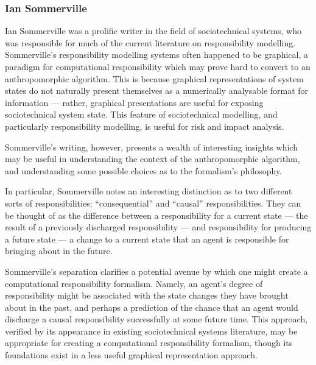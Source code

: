 \subsubsection{Ian Sommerville}
Ian Sommerville was a prolific writer in the field of sociotechnical systems, who was responsible for much of the current literature on responsibility modelling\cite{sommerville_graphical_responsibility,sommerville_dependable_systems_chap_8,sommerville_dependable_systems_chapter_9}. Sommerville's responsibility modelling systems often happened to be graphical\cite{sommerville_graphical_responsibility}, a paradigm for computational responsibility which may prove hard to convert to an anthropomorphic algorithm. This is because graphical representations of system states do not naturally present themselves as a numerically analysable format for information --- rather, graphical presentations are useful for exposing sociotechnical system state. This feature of sociotechnical modelling, and particularly responsibility modelling, is useful for risk and impact analysis\cite{ObashiMethodology}.\par

Sommerville's writing, however, presents a wealth of interesting insights which may be useful in understanding the context of the anthropomorphic algorithm, and understanding some possible choices as to the formalism's philosophy.\par

In particular, Sommerville notes an interesting distinction as to two different sorts of responsibilities: ``consequential'' and ``causal'' responsibilities. They can be thought of as the difference between a responsibility for a current state --- the result of a previously discharged responsibility --- and responsibility for producing a future state --- a change to a current state that an agent is responsible for bringing about in the future.\par

Sommerville's separation clarifies a potential avenue by which one might create a computational responsibility formalism. Namely, an agent's degree of responsibility might be associated with the state changes they have brought about in the past, and perhaps a prediction of the chance that an agent would discharge a causal responsibility successfully at some future time. This approach, verified by its appearance in existing sociotechnical systems literature, may be appropriate for creating a computational responsibility formalism, though its foundations exist in a less useful graphical representation approach.\par

